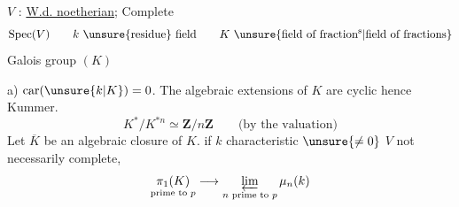 $V$ : \uline{W.d. noetherian}; Complete
\[
\operatorname{Spec}(V)\qquad k\ \text{\unsure{residue} field}\qquad K\ \text{\unsure{field of fraction\textsuperscript{s}|field of fractions}}
\]
Galois group $(K)$

a) $\operatorname{car}(\unsure{k|K})=0$\qquad {}.
The algebraic extensions of $K$ are  cyclic hence Kummer.
\[
K^*/K^{*n}\simeq\mathbf Z/n\mathbf Z\qquad\text{(by the valuation)}
\]
Let $\overline K$ be an algebraic closure of $K$.
if $k$ characteristic $\unsure{\ne0}$ $V$ not necessarily complete,
\[
\underset{\text{prime to }p}{\pi_1(K)}\longrightarrow\varprojlim_{n\text{ prime to }p}\mu_n(k)
\]
